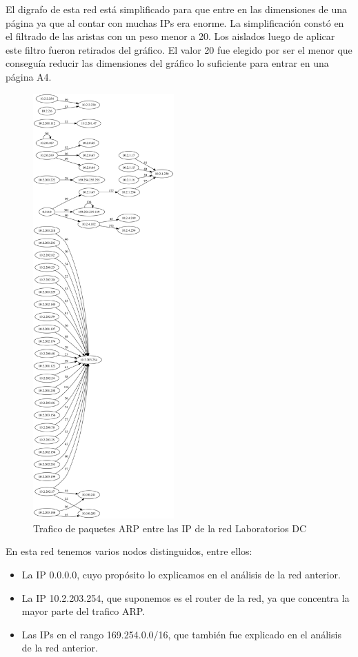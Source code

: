 El digrafo de esta red está simplificado para que entre en las dimensiones de una página ya que al contar con muchas IPs era enorme. La simplificación constó en el filtrado de las aristas con
un peso menor a 20. Los aislados luego de aplicar este filtro fueron retirados del gráfico. El valor 20 fue elegido por ser el menor que conseguía reducir las dimensiones del gráfico lo suficiente
para entrar en una página A4.

\begin{figure}[H]
  \centering
    \includegraphics[width=0.48\textwidth]{imagenes/labosDC/digrafo_labosDC.png}
  \caption{Trafico de paquetes ARP entre las IP de la red Laboratorios DC}
  \label{fig:ejemplo}
\end{figure}

En esta red tenemos varios nodos distinguidos, entre ellos:
\begin{itemize}
	\item La IP 0.0.0.0, cuyo propósito lo explicamos en el análisis de la red anterior.
	\item La IP 10.2.203.254, que suponemos es el router de la red, ya que concentra la mayor parte del trafico ARP.
	\item Las IPs en el rango 169.254.0.0/16, que también fue explicado en el análisis de la red anterior.
\end{itemize}

